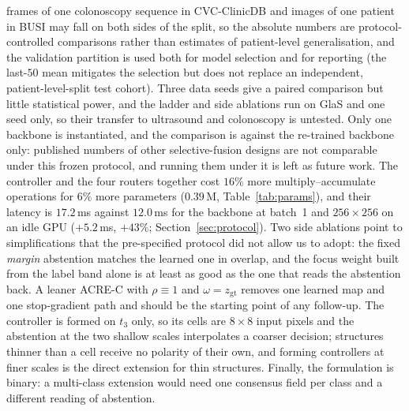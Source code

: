  frames of one colonoscopy sequence in CVC-ClinicDB and images of one patient in BUSI may fall on both sides of the split, so the absolute numbers are protocol-controlled comparisons rather than estimates of patient-level generalisation, and the validation partition is used both for model selection and for reporting (the last-$50$ mean mitigates the selection but does not replace an independent, patient-level-split test cohort). Three data seeds give a paired comparison but little statistical power, and the ladder and side ablations run on GlaS and one seed only, so their transfer to ultrasound and colonoscopy is untested. Only one backbone is instantiated, and the comparison is against the re-trained backbone only: published numbers of other selective-fusion designs are not comparable under this frozen protocol, and running them under it is left as future work. The controller and the four routers together cost $16\%$ more multiply--accumulate operations for $6\%$ more parameters ($0.39$\,M, Table~\ref{tab:params}), and their latency is $17.2$\,ms against $12.0$\,ms for the backbone at batch~1 and $256\times256$ on an idle GPU ($+5.2$\,ms, $+43\%$; Section~\ref{sec:protocol}). Two side ablations point to simplifications that the pre-specified protocol did not allow us to adopt: the fixed \emph{margin} abstention matches the learned one in overlap, and the focus weight built from the label band alone is at least as good as the one that reads the abstention back. A leaner ACRE-C with $\rho\equiv1$ and $\omega=z_{\mathrm{gt}}$ removes one learned map and one stop-gradient path and should be the starting point of any follow-up. The controller is formed on $t_3$ only, so its cells are $8\times8$ input pixels and the abstention at the two shallow scales interpolates a coarser decision; structures thinner than a cell receive no polarity of their own, and forming controllers at finer scales is the direct extension for thin structures. Finally, the formulation is binary: a multi-class extension would need one consensus field per class and a different reading of abstention.

